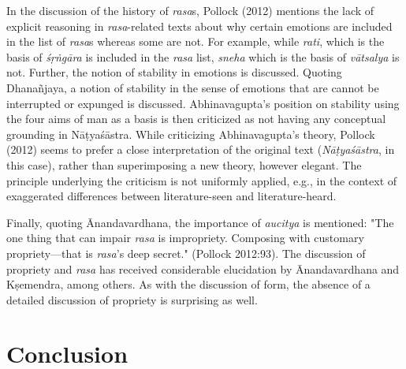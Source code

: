 In the discussion of the history of \textsl{rasa}s, Pollock (2012) mentions the lack of explicit reasoning in \textsl{rasa}-related texts about why certain emotions are included in the list of \textsl{rasa}s whereas some are not. For example, while \textsl{rati}, which is the basis of \textsl{śṛṅgāra} is included in the \textsl{rasa} list, \textsl{sneha} which is the basis of \textsl{vātsalya} is not. Further, the notion of stability in emotions is discussed. Quoting Dhanañjaya, a notion of stability in the sense of emotions that are cannot be interrupted or expunged is discussed. Abhinavagupta’s position on stability using the four aims of man as a basis is then criticized as not having any conceptual grounding in Nāṭyaśāstra. While criticizing Abhinavagupta’s theory, Pollock (2012) seems to prefer a close interpretation of the original text (\textsl{Nāṭyaśāstra}, in this case), rather than superimposing a new theory, however elegant. The principle underlying the criticism is not uniformly applied, e.g., in the context of exaggerated differences between literature-seen and literature-heard. 

Finally, quoting Ānandavardhana, the importance of \textsl{aucitya} is mentioned: "The one thing that can impair \textsl{rasa} is impropriety. Composing with customary propriety—that is \textsl{rasa}’s deep secret." (Pollock 2012:93). The discussion of propriety and \textsl{rasa} has received considerable elucidation by Ānandavardhana and Kṣemendra, among others. As with the discussion of form, the absence of a detailed discussion of propriety is surprising as well. 

\section*{Conclusion}

